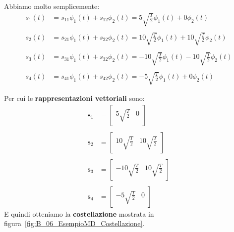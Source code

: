 Abbiamo molto semplicemente:
\[
    \begin{aligned}
        s_{1}(t) &= s_{11}\phi_{1}(t) + s_{12}\phi_{2}(t) 
        = 5 \sqrt{\frac{T}{2}} \phi_{1}(t) + 0 \phi_{2}(t) \\ \\
        s_{2}(t) &= s_{21}\phi_{1}(t) + s_{22}\phi_{2}(t) 
        = 10 \sqrt{\frac{T}{2}} \phi_{1}(t) + 10 \sqrt{\frac{T}{2}} \phi_{2}(t) \\ \\
        s_{3}(t) &= s_{31}\phi_{1}(t) + s_{32}\phi_{2}(t) 
        = -10 \sqrt{\frac{T}{2}} \phi_{1}(t) - 10 \sqrt{\frac{T}{2}} \phi_{2}(t) \\ \\
        s_{4}(t) &= s_{41}\phi_{1}(t) + s_{42}\phi_{2}(t) 
        = -5 \sqrt{\frac{T}{2}} \phi_{1}(t) + 0 \phi_{2}(t)
    \end{aligned}
\]

Per cui le \textbf{rappresentazioni vettoriali} sono:
\[
    \begin{aligned}
        \mathbf{s}_1 &= \begin{bmatrix} 5 \sqrt{\frac{T}{2}} & 0 \end{bmatrix} \\ \\
        \mathbf{s}_2 &= \begin{bmatrix} 10 \sqrt{\frac{T}{2}} & 10 \sqrt{\frac{T}{2}} \end{bmatrix} \\ \\
        \mathbf{s}_3 &= \begin{bmatrix} -10 \sqrt{\frac{T}{2}} & 10 \sqrt{\frac{T}{2}} \end{bmatrix} \\ \\
        \mathbf{s}_4 &= \begin{bmatrix} -5 \sqrt{\frac{T}{2}} & 0 \end{bmatrix}
    \end{aligned}
\]
E quindi otteniamo la \textbf{costellazione} mostrata in figura~\ref{fig:B_06_EsempioMD_Costellazione}.

